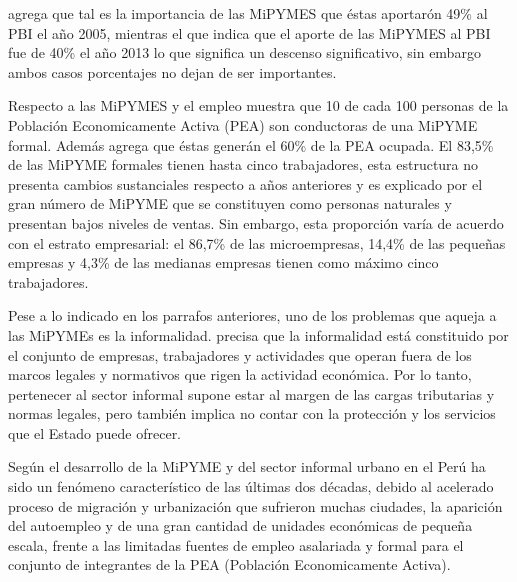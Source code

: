 \cite{arbulu} agrega que tal es la importancia de las MiPYMES que \'estas aportar\'on
49\% al PBI el a\~no 2005, mientras el que \citep{produce} indica que el aporte
de las MiPYMES al PBI fue de 40\% el a\~no 2013 lo que significa un descenso significativo,
sin embargo ambos casos porcentajes no dejan de ser importantes.

Respecto a las MiPYMES y el empleo \cite{produce2} muestra que 10 de cada 100 personas
de la Poblaci\'on Economicamente Activa (PEA) son conductoras de una MiPYME formal.
Adem\'as agrega que \'estas gener\'an el 60\% de la PEA ocupada. El 83,5\% de las
MiPYME formales tienen hasta cinco trabajadores, esta estructura no presenta cambios
sustanciales respecto a a\~nos anteriores y es explicado por el gran n\'umero de
MiPYME que se constituyen como personas naturales y presentan bajos niveles de
ventas. Sin embargo, esta proporci\'on var\'ia de acuerdo con el estrato empresarial:
el 86,7\% de las microempresas, 14,4\% de las peque\~nas empresas y 4,3\% de las
medianas empresas tienen como m\'aximo cinco trabajadores.

Pese a lo indicado en los parrafos anteriores, uno de los problemas que aqueja a
las MiPYMEs es la informalidad. \cite{loayza} precisa que la informalidad est\'a
constituido por el conjunto de empresas, trabajadores y actividades que operan
fuera de los marcos legales y normativos que rigen la actividad econ\'omica. Por
lo tanto, pertenecer al sector informal supone estar al margen de las cargas
tributarias y normas legales, pero tambi\'en implica no contar con la protecci\'on
y los servicios que el Estado puede ofrecer.

Seg\'un \cite{arbulu} el desarrollo de la MiPYME y del sector informal urbano
en el Per\'u ha sido un fen\'omeno caracter\'istico de las \'ultimas dos
d\'ecadas, debido al acelerado proceso de migraci\'on y urbanizaci\'on que
sufrieron muchas ciudades, la aparici\'on del autoempleo y de una gran cantidad
de unidades econ\'omicas de peque\~na escala, frente a las limitadas fuentes
de empleo asalariada y formal para el conjunto de integrantes de la PEA (Poblaci\'on
Economicamente Activa).


